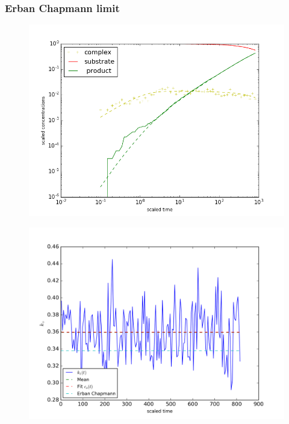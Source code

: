 \documentclass[
  a4paper,BCOR10mm,oneside,
  bibtotoc,idxtotoc,
  headsepline,footsepline,%
  fleqn,openbib
]{scrbook}
\begin{document}
\subsubsection{Erban Chapmann limit}
\begin{figure}[h!]
  \centering
  \includegraphics[width=\textwidth]{./data/erban-chapman-limit-concentrations1.png}
  \captionsetup{width=\linewidth}
  \label{fig:diffusion_limit-Erban-Chapmann}
\end{figure}
\begin{figure}[h!]
  \centering
  \includegraphics[width=\textwidth]{./data/chapman-limit-concentrations1_k1.png}
  \captionsetup{width=\linewidth}
  \label{fig:diffusion_limit-Erban-Chapmann_k1}
\end{figure}
\end{document}
